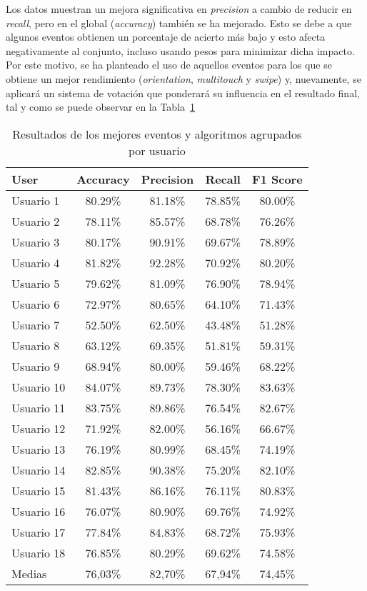 Los datos muestran un mejora significativa en \textit{precision} a cambio de reducir en \textit{recall}, pero en el global (\textit{accuracy}) también se ha mejorado. Esto se debe a que algunos eventos obtienen un porcentaje de acierto más bajo y esto afecta negativamente al conjunto, incluso usando pesos para minimizar dicha impacto. Por este motivo, se ha planteado el uso de aquellos eventos para los que se obtiene un mejor rendimiento (\textit{orientation}, \textit{multitouch} y \textit{swipe}) y, nuevamente, se aplicará un sistema de votación que ponderará su influencia en el resultado final, tal y como se puede observar en la Tabla~\ref{tab:combine_selected_results}



\begin{table}[!h]
    \centering
    \begin{tabular}{l c c c c}
\toprule
User & Accuracy & Precision &  Recall & F1 Score\\
\midrule
Usuario 1 & 80.29\% &    81.18\% &  78.85\% &   80.00\% \\
Usuario 2 & 78.11\% &    85.57\% &  68.78\% &   76.26\% \\
Usuario 3 & 80.17\% &    90.91\% &  69.67\% &   78.89\% \\
Usuario 4 & 81.82\% &    92.28\% &  70.92\% &   80.20\% \\
Usuario 5 & 79.62\% &    81.09\% &  76.90\% &   78.94\% \\
Usuario 6 & 72.97\% &    80.65\% &  64.10\% &   71.43\% \\
Usuario 7 & 52.50\% &    62.50\% &  43.48\% &   51.28\% \\
Usuario 8 & 63.12\% &    69.35\% &  51.81\% &   59.31\% \\
Usuario 9 & 68.94\% &    80.00\% &  59.46\% &   68.22\% \\
Usuario 10 & 84.07\% &    89.73\% &  78.30\% &   83.63\% \\
Usuario 11 & 83.75\% &    89.86\% &  76.54\% &   82.67\% \\
Usuario 12 & 71.92\% &    82.00\% &  56.16\% &   66.67\% \\
Usuario 13 & 76.19\% &    80.99\% &  68.45\% &   74.19\% \\
Usuario 14 & 82.85\% &    90.38\% &  75.20\% &   82.10\% \\
Usuario 15 & 81.43\% &    86.16\% &  76.11\% &   80.83\% \\
Usuario 16 & 76.07\% &    80.90\% &  69.76\% &   74.92\% \\
Usuario 17 & 77.84\% &    84.83\% &  68.72\% &   75.93\% \\
Usuario 18 & 76.85\% &    80.29\% &  69.62\% &   74.58\% \\
\midrule
Medias & 76,03\% &	82,70\% &	67,94\% &	74,45\%  \\
\bottomrule
\end{tabular}
    \caption{Resultados de los mejores eventos y algoritmos agrupados por usuario}
    \label{tab:combine_selected_results}
\end{table}


